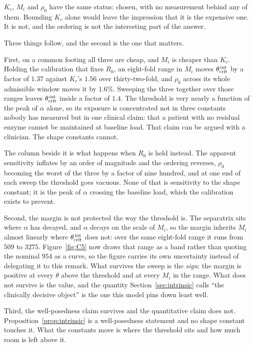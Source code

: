 \begin{remark}
\label{rem:shape}
$K_c$, $M_i$ and $\rho_0$ have the same status: chosen, with no measurement behind any of
them. Bounding $K_c$ alone would leave the impression that it is the expensive one. It is
not, and the ordering is not the interesting part of the answer.

\begin{center}
\scriptsize

\end{center}

Three things follow, and the second is the one that matters.

First, on a common footing all three are cheap, and $M_i$ is cheaper than $K_c$.
Holding the calibration that fixes $R_0$, an eight-fold range in $M_i$ moves
$\theta_{\mathrm{crit}}^{\,\mathrm{int}}$ by a factor of $1.37$ against $K_c$'s $1.56$ over thirty-two-fold,
and $\rho_0$ across its whole admissible window moves it by $1.6\%$. Sweeping the three
together over those ranges leaves $\theta_{\mathrm{crit}}^{\,\mathrm{int}}$ inside a factor of $1.4$.
The threshold is very nearly a function of the peak of $\alpha$ alone, so its
exposure is concentrated not in three constants nobody has measured but in one clinical
claim: that a patient with no residual enzyme cannot be maintained at baseline load. That
claim can be argued with a clinician. The shape constants cannot.

The column beside it is what happens when $R_0$ is held instead. The apparent sensitivity
inflates by an order of magnitude and the ordering reverses, $\rho_0$ becoming the worst of
the three by a factor of nine hundred, and at one end of each sweep the threshold goes
vacuous. None of that is sensitivity to the shape constant; it is the peak of $\alpha$
crossing the baseline load, which the calibration exists to prevent.

Second, the margin is not protected the way the threshold is. The separatrix sits
where $\alpha$ has decayed, and $\alpha$ decays on the scale of $M_i$, so the margin
inherits $M_i$ almost linearly where $\theta_{\mathrm{crit}}^{\,\mathrm{int}}$ does not: over the same
eight-fold range it runs from $509$ to $3275$. Figure~\ref{fig:C5} now draws that
range as a band rather than quoting the nominal $954$ as a curve, so the figure carries its
own uncertainty instead of delegating it to this remark. What survives the sweep is the
\emph{sign}: the margin is positive at every $\theta$ above the threshold and at every
$M_i$ in the range. What does not survive is the value, and the quantity
Section~\ref{sec:intrinsic} calls ``the clinically decisive object'' is the one this model
pins down least well.

Third, the well-posedness claim survives and the quantitative claim does not.
Proposition~\ref{prop:intrinsic} is a well-posedness statement and no shape constant touches it.
What the constants move is where the threshold sits and how much room is left above it.
\end{remark}

